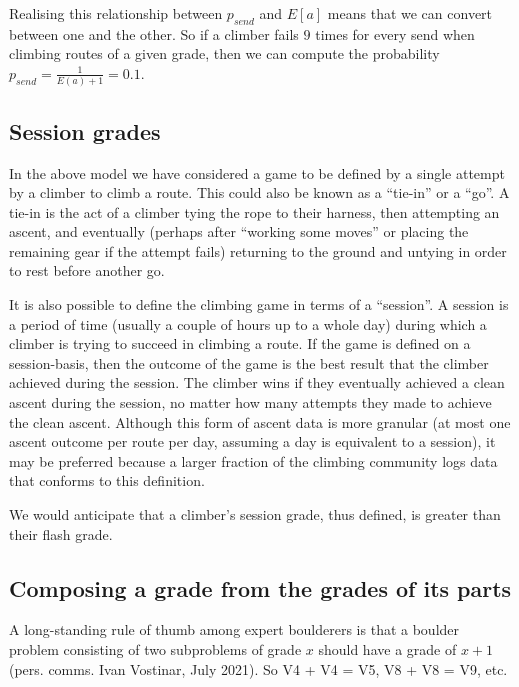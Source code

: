 \documentclass{article}
\begin{document}
Realising this relationship between $p_{send}$ and $ E\left[a\right]$ means that we can convert between one and the other. So if a climber fails $9$ times for every send when climbing routes of a given grade, then we can compute the probability  $p_{send} = \frac{1}{E(a)+1} = 0.1$.

\subsection*{Session grades}

In the above model we have considered a game to be defined by a single attempt by a climber to climb a route. This could also be known as a ``tie-in'' or a ``go''. A tie-in is the act of a climber tying the rope to their harness, then attempting an ascent, and eventually (perhaps after ``working some moves'' or placing the remaining gear if the attempt fails) returning to the ground and untying in order to rest before another go.

It is also possible to define the climbing game in terms of a ``session''. A session is a period of time (usually a couple of hours up to a whole day) during which a climber is trying to succeed in climbing a route. If the game is defined on a session-basis, then the outcome of the game is the best result that the climber achieved during the session. The climber wins if they eventually achieved a clean ascent during the session, no matter how many attempts they made to achieve the clean ascent. Although this form of ascent data is more granular (at most one ascent outcome per route per day, assuming a day is equivalent to a session), it may be preferred because a larger fraction of the climbing community logs data that conforms to this definition.

We would anticipate that a climber's session grade, thus defined, is greater than their flash grade. 

\subsection*{Composing a grade from the grades of its parts}

A long-standing rule of thumb among expert boulderers is that a boulder problem consisting of two subproblems of grade $x$ should have a grade of $x+1$ (pers. comms. Ivan Vostinar, July 2021). So V4 + V4 = V5, V8 + V8 = V9, etc.
\end{document}
